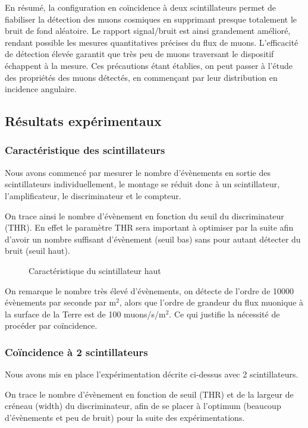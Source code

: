 \documentclass[a4paper,12pt,twoside]{article}
\begin{document}
En résumé, la configuration en coïncidence à deux scintillateurs permet de fiabiliser la détection des muons cosmiques en supprimant presque totalement le bruit de fond aléatoire. Le rapport signal/bruit est ainsi grandement amélioré, rendant possible les mesures quantitatives précises du flux de muons. L’efficacité de détection élevée garantit que très peu de muons traversant le dispositif échappent à la mesure. Ces précautions étant établies, on peut passer à l’étude des propriétés des muons détectés, en commençant par leur distribution en incidence angulaire.

\subsection{Résultats expérimentaux}
\subsubsection{Caractéristique des scintillateurs}
Nous avons commencé par mesurer le nombre d’évènements en sortie des scintillateurs individuellement, le montage se réduit donc à un scintillateur, l’amplificateur, le discriminateur et le compteur.

On trace ainsi le nombre d’évènement en fonction du seuil du discriminateur (THR). En effet le paramètre THR sera important à optimiser par la suite afin d’avoir un nombre suffisant d’évènement (seuil bas) sans pour autant détecter du bruit (seuil haut).

\begin{figure}[ht!]
    \centering
    \caption[Caractéristique du scintillateur haut]{Caractéristique du scintillateur haut}
\end{figure}

On remarque le nombre très élevé d’évènements, on détecte de l’ordre de 10000 évènements par seconde par m$^2$, alors que l’ordre de grandeur du flux muonique à la surface de la Terre est de 100 muons/s/m$^2$. Ce qui justifie la nécessité de procéder par coïncidence.

\subsubsection{Coïncidence à 2 scintillateurs}
Nous avons mis en place l’expérimentation décrite ci-dessus avec 2 scintillateurs.

On trace le nombre d’évènement en fonction de seuil (THR) et de la largeur de créneau (width) du discriminateur, afin de se placer à l’optimum (beaucoup d’évènements et peu de bruit) pour la suite des expérimentations.
\end{document}

